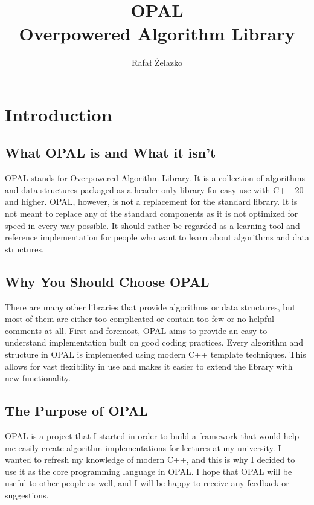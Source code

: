 \documentclass[titlepage, a4paper, 12pt]{article}
\title{
    OPAL \\
    \large{Overpowered Algorithm Library}
}
\author{Rafał Żelazko}
\begin{document}
    \maketitle

    \tableofcontents
    
    \clearpage
    \section{Introduction}

    \subsection{What OPAL is and What it isn't}

    OPAL stands for Overpowered Algorithm Library. It is a collection of algorithms and data structures packaged as a header-only library for easy use with C++ 20 and higher. OPAL, however, is not a replacement for the standard library. It is not meant to replace any of the standard components as it is not optimized for speed in every way possible. It should rather be regarded as a learning tool and reference implementation for people who want to learn about algorithms and data structures.

    \subsection{Why You Should Choose OPAL}

    There are many other libraries that provide algorithms or data structures, but most of them are either too complicated or contain too few or no helpful comments at all. First and foremost, OPAL aims to provide an easy to understand implementation built on good coding practices. Every algorithm and structure in OPAL is implemented using modern C++ template techniques. This allows for vast flexibility in use and makes it easier to extend the library with new functionality.

    \subsection{The Purpose of OPAL}

    OPAL is a project that I started in order to build a framework that would help me easily create algorithm implementations for lectures at my university. I wanted to refresh my knowledge of modern C++, and this is why I decided to use it as the core programming language in OPAL. I hope that OPAL will be useful to other people as well, and I will be happy to receive any feedback or suggestions.
\end{document}
